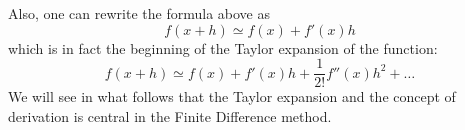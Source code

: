 \noindent Also, one can rewrite the formula above as
\[
f(x+h) \simeq f(x) +  f'(x) h
\]
which is in fact the beginning of the Taylor expansion of the function:
\[
f(x+h) \simeq f(x) +  f'(x) h + \frac{1}{2!} f''(x) h^2 + \dots 
\]
We will see in what follows that the Taylor expansion and the concept of derivation is 
central in the Finite Difference method. 


